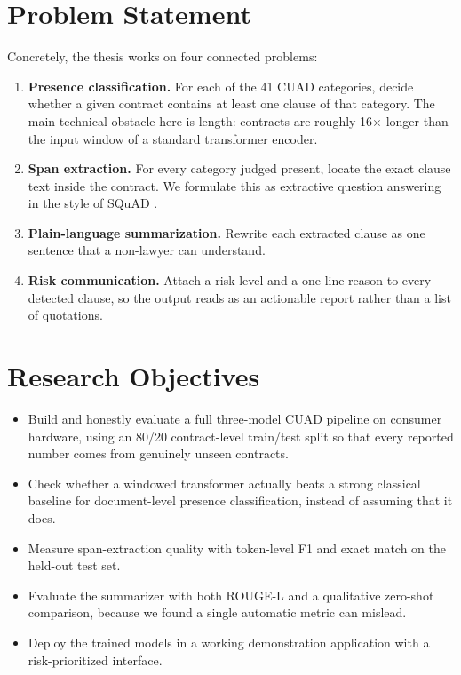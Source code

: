 \section{Problem Statement}
Concretely, the thesis works on four connected problems:
\begin{enumerate}[itemsep=2pt]
  \item \textbf{Presence classification.} For each of the 41 CUAD categories, decide whether a given contract contains at least one clause of that category. The main technical obstacle here is length: contracts are roughly 16$\times$ longer than the input window of a standard transformer encoder.
  \item \textbf{Span extraction.} For every category judged present, locate the exact clause text inside the contract. We formulate this as extractive question answering in the style of SQuAD \cite{rajpurkar2016squad}.
  \item \textbf{Plain-language summarization.} Rewrite each extracted clause as one sentence that a non-lawyer can understand.
  \item \textbf{Risk communication.} Attach a risk level and a one-line reason to every detected clause, so the output reads as an actionable report rather than a list of quotations.
\end{enumerate}

\section{Research Objectives}
\begin{itemize}[itemsep=2pt]
  \item Build and honestly evaluate a full three-model CUAD pipeline on consumer hardware, using an 80/20 contract-level train/test split so that every reported number comes from genuinely unseen contracts.
  \item Check whether a windowed transformer actually beats a strong classical baseline for document-level presence classification, instead of assuming that it does.
  \item Measure span-extraction quality with token-level F1 and exact match on the held-out test set.
  \item Evaluate the summarizer with both ROUGE-L and a qualitative zero-shot comparison, because we found a single automatic metric can mislead.
  \item Deploy the trained models in a working demonstration application with a risk-prioritized interface.
\end{itemize}

